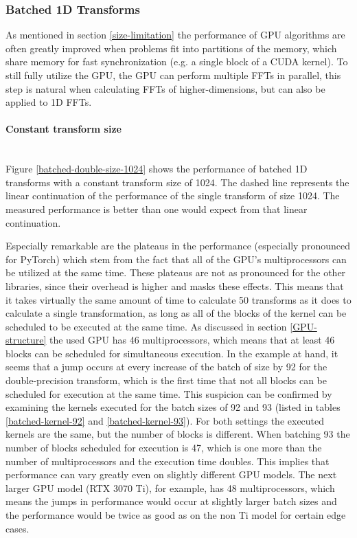 \documentclass[english,11pt,a4paper,table]{article} %
\begin{document}
\subsubsection{Batched 1D Transforms}

As mentioned in section \ref{size-limitation} the performance of GPU algorithms are often greatly improved when problems fit into partitions of the memory, which share memory for fast synchronization (e.g. a single block of a CUDA kernel).
To still fully utilize the GPU, the GPU can perform multiple FFTs in parallel, this step is natural when calculating FFTs of higher-dimensions, but can also be applied to 1D FFTs.

\paragraph{Constant transform size}\mbox{}\\

Figure \ref{batched-double-size-1024} shows the performance of batched 1D transforms with a constant transform size of 1024.
The dashed line represents the linear continuation of the performance of the single transform of size 1024.
The measured performance is better than one would expect from that linear continuation.

Especially remarkable are the plateaus in the performance (especially pronounced for PyTorch) which stem from the fact that all of the GPU's multiprocessors can be utilized at the same time.
These plateaus are not as pronounced for the other libraries, since their overhead is higher and masks these effects.
This means that it takes virtually the same amount of time to calculate 50 transforms as it does to calculate a single transformation, as long as all of the blocks of the kernel can be scheduled to be executed at the same time.
As discussed in section \ref{GPU-structure} the used GPU has 46 multiprocessors, which means that at least 46 blocks can be scheduled for simultaneous execution.
In the example at hand, it seems that a jump occurs at every increase of the batch of size by 92 for the double-precision transform, which is the first time that not all blocks can be scheduled for execution at the same time.
This suspicion can be confirmed by examining the kernels executed for the batch sizes of 92 and 93 (listed in tables \ref{batched-kernel-92} and \ref{batched-kernel-93}).
For both settings the executed kernels are the same, but the number of blocks is different.
When batching 93 the number of blocks scheduled for execution is 47, which is one more than the number of multiprocessors and the execution time doubles.
This implies that performance can vary greatly even on slightly different GPU models.
The next larger GPU model (RTX 3070 Ti), for example, has 48 multiprocessors, which means the jumps in performance would occur at slightly larger batch sizes and the performance would be twice as good as on the non Ti model for certain edge cases.
\end{document}
